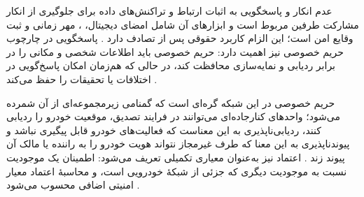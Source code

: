 عدم انکار  و پاسخگویی  به اثبات ارتباط و تراکنش‌های داده برای جلوگیری از انکار مشارکت طرفین مربوط است و ابزارهای آن شامل امضای دیجیتال،  ، مهر زمانی و ثبت وقایع امن است؛ این الزام کاربرد حقوقی پس از تصادف دارد \cite{VanetSecurityPrivacy}. پاسخگویی در چارچوب حریم خصوصی نیز اهمیت دارد: حریم خصوصی باید اطلاعات شخصی و مکانی را در برابر ردیابی و نمایه‌سازی محافظت کند، در حالی که هم‌زمان امکان پاسخ‌گویی در اختلافات یا تحقیقات را حفظ می‌کند \cite{VanetSecurityPrivacy}.

حریم خصوصی  در این شبکه گره‌ای است که گمنامی زیرمجموعه‌ای از آن شمرده می‌شود؛ واحدهای کنارجاده‌ای می‌توانند در فرایند تصدیق، موقعیت خودرو را ردیابی کنند، ردیابی‌ناپذیری به این معناست که فعالیت‌های خودرو قابل پیگیری نباشد و پیوندناپذیری به این معنا که طرف غیرمجاز نتواند هویت خودرو را به راننده یا مالک آن پیوند زند \cite{farsimadanReviewSecurityChallenges2025}. اعتماد  نیز به‌عنوان معیاری تکمیلی تعریف می‌شود: اطمینان یک موجودیت نسبت به موجودیت دیگری که جزئی از شبکهٔ خودرویی است، و محاسبهٔ اعتماد معیار امنیتی اضافی محسوب می‌شود \cite{farsimadanReviewSecurityChallenges2025}.
